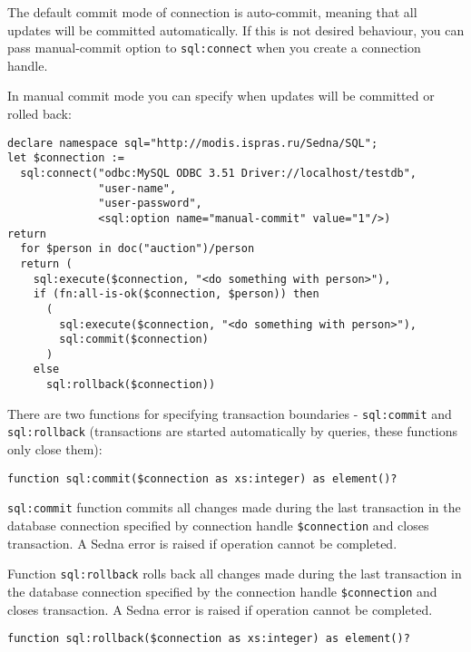 \documentclass[a4paper,12pt]{article}
\begin{document}
The default commit mode of connection is auto-commit, meaning that all updates
will be committed automatically. If this is not desired behaviour, you can pass
manual-commit option to \verb!sql:connect! when you create a connection handle.

In manual commit mode you can specify when updates will be committed or rolled
back:

\small{
\begin{verbatim}
declare namespace sql="http://modis.ispras.ru/Sedna/SQL";
let $connection :=
  sql:connect("odbc:MySQL ODBC 3.51 Driver://localhost/testdb",
              "user-name",
              "user-password",
              <sql:option name="manual-commit" value="1"/>)
return
  for $person in doc("auction")/person
  return (
    sql:execute($connection, "<do something with person>"),
    if (fn:all-is-ok($connection, $person)) then
      (
        sql:execute($connection, "<do something with person>"),
        sql:commit($connection)
      )
    else
      sql:rollback($connection))
\end{verbatim}}

There are two functions for specifying transaction boundaries -
\verb!sql:commit! and \verb!sql:rollback! (transactions are started
automatically by queries, these functions only close them):

\begin{verbatim}
function sql:commit($connection as xs:integer) as element()?
\end{verbatim}

\verb!sql:commit! function commits all changes made during the last transaction
in the database connection specified by connection handle \verb!$connection! and
closes transaction. A Sedna error is raised if operation cannot be completed.

Function \verb!sql:rollback! rolls back all changes made during the last
transaction in the database connection specified by the connection handle
\verb!$connection! and closes transaction. A Sedna error is raised if operation
cannot be completed.

\begin{verbatim}
function sql:rollback($connection as xs:integer) as element()?
\end{verbatim}


\end{document}
